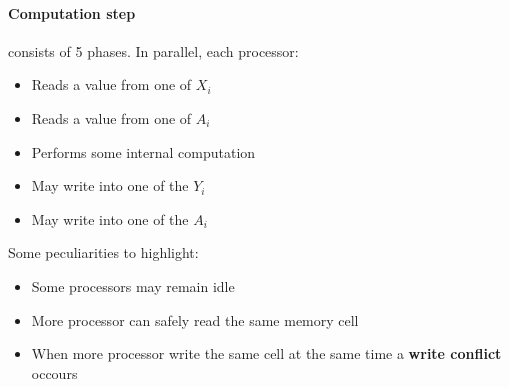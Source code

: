 \documentclass{article}
\begin{document}
\paragraph{Computation step} consists of 5 phases. In parallel, each processor:
\begin{itemize}
\item Reads a value from one of $X_i$
\item Reads a value from one of $A_i$
\item Performs some internal computation
\item May write into one of the $Y_i$
\item May write into one of the $A_i$
\end{itemize}
Some peculiarities to highlight:
\begin{itemize}
\item Some processors may remain idle
\item More processor can safely read the same memory cell
\item When more processor write the same cell at the same time a \textbf{write conflict} occours
\end{itemize}
\end{document}

